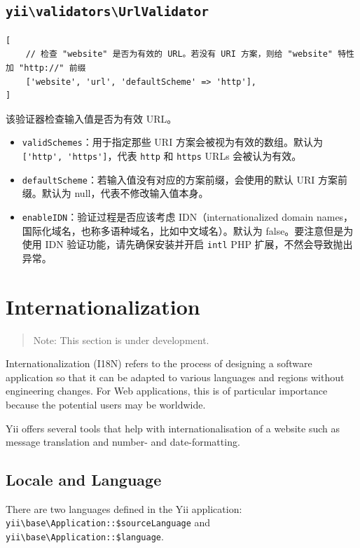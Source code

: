 \subsection{\texttt{yii{\allowbreak{}\textbackslash}validators{\allowbreak{}\textbackslash}UrlValidator} \label{tutorial-core-validators.md::url}}
\lstset{language=php}\begin{lstlisting}
[
    // 检查 "website" 是否为有效的 URL。若没有 URI 方案，则给 "website" 特性加 "http://" 前缀
    ['website', 'url', 'defaultScheme' => 'http'],
]
\end{lstlisting}
该验证器检查输入值是否为有效 URL。

\begin{itemize}
\item \lstinline|validSchemes|：用于指定那些 URI 方案会被视为有效的数组。默认为 \lstinline|['http', 'https']|，代表 \lstinline|http| 和 \lstinline|https| URLs 会被认为有效。
\item \lstinline|defaultScheme|：若输入值没有对应的方案前缀，会使用的默认 URI 方案前缀。默认为 null，代表不修改输入值本身。
\item \lstinline|enableIDN|：验证过程是否应该考虑 IDN（internationalized domain names，国际化域名，也称多语种域名，比如中文域名）。默认为 false。要注意但是为使用 IDN 验证功能，请先确保安装并开启 \lstinline|intl| PHP 扩展，不然会导致抛出异常。
\end{itemize}


\label{tutorial-i18n.md}\section{Internationalization}
\begin{quote}Note: This section is under development.

\end{quote}
Internationalization (I18N) refers to the process of designing a software application so that it can be adapted to
various languages and regions without engineering changes. For Web applications, this is of particular importance
because the potential users may be worldwide.

Yii offers several tools that help with internationalisation of a website such as message translation and
number- and date-formatting.

\subsection{Locale and Language}
There are two languages defined in the Yii application: \texttt{yii{\allowbreak{}\textbackslash}base{\allowbreak{}\textbackslash}Application\allowbreak{}::\allowbreak{}\$sourceLanguage} and
\texttt{yii{\allowbreak{}\textbackslash}base{\allowbreak{}\textbackslash}Application\allowbreak{}::\allowbreak{}\$language}.

